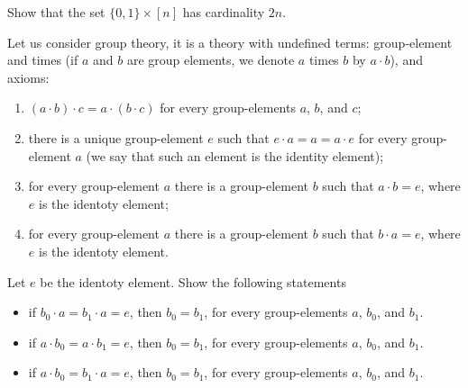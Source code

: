 \documentclass[addpoints]{exam}
\begin{document}
  \pagestyle{headandfoot}
  \runningheadrule

  \firstpagefooter{}{}{}
  \runningfooter{}{}{}
  \begin{flushright}

    \vspace{0.2in}
  \end{flushright}

  \begin{questions}
    \question[10]
      Show that the set $\{0, 1\} \times [n]$ has cardinality $2n$.

      \begin{solution}[\stretch{1}]
      \end{solution}
      \newpage
    \question[10]
      Let us consider group theory, it is a theory with undefined
			terms: group-element and times (if $a$ and $b$ are group elements, we denote $a$ times $b$ by $a \cdot b$), and axioms:
			\begin{enumerate}
			  \item $(a \cdot b) \cdot c = a \cdot (b \cdot c)$
			    for every group-elements $a$, $b$, and $c$;
			  \item there is a unique group-element $e$ such that
			    $e \cdot a = a = a \cdot e$ for every group-element $a$ (we say that such
			    an element is the identity element);
			  \item for every group-element $a$ there is a group-element $b$
			    such that $a \cdot b = e$, where $e$ is the identoty element;
			  \item for every group-element $a$ there is a group-element $b$
			    such that $b \cdot a = e$, where $e$ is the identoty element.
			\end{enumerate}
			
			Let $e$ be the identoty element. Show the following statements
			\begin{itemize}
			  \item if $b_0 \cdot a = b_1 \cdot a = e$, then $b_0 = b_1$, for every   
			    group-elements $a$, $b_0$, and $b_1$.
			  \item if $a \cdot b_0 = a \cdot b_1 = e$, then $b_0 = b_1$, for every
			    group-elements $a$, $b_0$, and $b_1$.
			  \item if $a \cdot b_0 = b_1 \cdot a = e$, then $b_0 = b_1$, for every
			    group-elements $a$, $b_0$, and $b_1$.
			\end{itemize}

      \begin{solution}[\stretch{1}]
      \end{solution}
      \newpage
  \end{questions}
\end{document}
